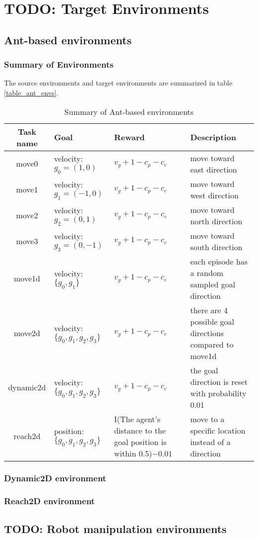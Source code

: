 \section{TODO: Target Environments}\label{sec_env}
\subsection{Ant-based environments}
\subsubsection{Summary of Environments}
The source environments and target environments are summarized in table \ref{table_ant_envs}.


\begin{table}[h]

\begin{center}
\begin{tabular}{|c|p{3cm}|p{4cm}|p{4cm}|}
\hline
Task name & Goal & Reward  &  Description \\
\hline\hline
move0 & velocity: $g_0=(1,0)$ &$ v_g+1-c_p-c_c$  & move toward east direction \\
\hline
move1 & velocity: $g_1=(-1,0)$ &$ v_g+1-c_p-c_c$  & move toward west direction \\
\hline
move2 & velocity: $g_2=(0,1)$ &$ v_g+1-c_p-c_c$  & move toward north direction \\
\hline
move3 & velocity: $g_3=(0,-1)$ &$ v_g+1-c_p-c_c$  & move toward south direction \\ 
\hline 
move1d & velocity: $\{g_0,g_1\}$ &$ v_g+1-c_p-c_c$  & each episode has a random sampled goal direction \\ \hline
move2d & velocity: $\{g_0,g_1,g_2,g_3\}$ &$ v_g+1-c_p-c_c$  & there are 4 possible goal directions compared to move1d \\ \hline
dynamic2d & velocity: $\{g_0,g_1,g_2,g_3\}$ &$ v_g+1-c_p-c_c$  & the goal direction is reset with probability 0.01 \\ \hline
reach2d & position: $\{g_0,g_1,g_2,g_3\}$ & I(The agent's distance to the goal position is within 0.5)$-0.01$  & move to a specific location instead of a direction\\ \hline

\hline
\end{tabular}
\end{center}
\caption{Summary of Ant-based environments}
\end{table}\label{table_ant_envs}


\subsubsection{Dynamic2D environment}
\subsubsection{Reach2D environment}
\subsection{TODO: Robot manipulation environments}
